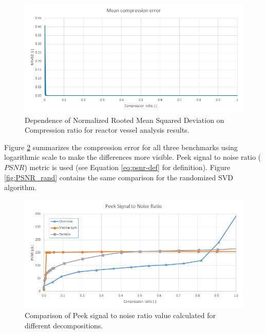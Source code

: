 \begin{figure}[H]
\centering
\includegraphics[width=\textwidth]{figures/appendix-SVD/mechaxisym_NRMSD}
\decoRule
\caption{Dependence of Normalized Rooted Mean Squared Deviation on Compression ratio for reactor vessel analysis results.}
\label{fig:mechaxisym:NRMSD}
\end{figure}

Figure \ref{fig:PSNR} summarizes the compression error for all three benchmarks using logarithmic scale to make the differences more visible. Peek signal to noise ratio ($\mathit{PSNR}$) metric is used (see Equation \ref{eq:psnr-def} for definition). Figure \ref{fig:PSNR_rand} contains the same comparison for the randomized SVD algorithm.

\begin{figure}[H]
\centering
\includegraphics[width=\textwidth]{figures/appendix-SVD/PSNR}
\decoRule
\caption{Comparison of Peek signal to noise ratio value calculated for different decompositions.}
\label{fig:PSNR}
\end{figure}

